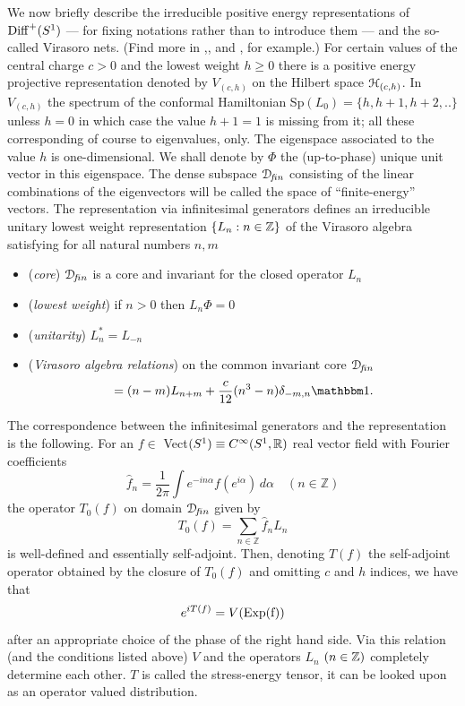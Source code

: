 \documentclass[12pt]{article}
\begin{document}
We now briefly describe the irreducible positive energy representations of
${{\rm Diff}^+(S^1)}$ --- for fixing notations rather than to introduce them ---
and the so-called Virasoro nets. (Find more in \cite{KaRa},\cite{GoWa},
\cite{Tol99} and
\cite{DMS}, for example.) For certain values of the central charge $c>0$
and the lowest weight $h \geq 0$ there is a positive energy
projective representation denoted by $V_{(c,h)}$ on the
Hilbert space ${\mathcal H}_{(c,h)}$.
In $V_{(c,h)}$ the spectrum of the conformal Hamiltonian
Sp$(L_0)=\{h,h+1,h+2,..\}$ unless $h=0$ in which case  
the value $h+1=1$ is missing from it; all these corresponding
of course to eigenvalues, only. The eigenspace associated to
the value $h$ is one-dimensional. We shall denote by $\Phi$
the (up-to-phase) unique unit vector in this eigenspace.
The dense subspace ${\mathcal D}\!_{f\!in}$ consisting of the linear combinations of the
eigenvectors will be called the space of ``finite-energy'' vectors.
The representation via infinitesimal generators defines an
irreducible unitary lowest weight representation 
$\{L_n : n \in {\mathbb Z} \}$ of the Virasoro algebra satisfying
for all natural numbers $n,m$
\begin{itemize}
\item[1.] \!({\it core})
${\mathcal D}\!_{f\!in}$ is a core and invariant for the closed operator $L_n$
\item[2.] \!({\it lowest weight})
if $n>0$ then $L_n \Phi = 0$
\item[3.] \!({\it unitarity})
$L_n^*=L_{-n}$
\item[4.] \!({\it Virasoro algebra relations})
on the common invariant core ${\mathcal D}\!_{f\!in}$
\begin{equation}
[L_n,L_m]=(n-m)L_{n+m}+\frac{c}{12}(n^3-n)\delta_{-m,n} \mathbbm 1.
\end{equation}
\end{itemize}
The correspondence between the infinitesimal generators and the
representation is the following.
For an $f\in $ Vect$(S^1) \equiv C^\infty(S^1,{\mathbb R})$ 
real vector field with Fourier coefficients
\begin{equation}
\hat{f}_n=\frac{1}{2\pi}\int e^{-in\alpha}f(e^{i\alpha})\,d\alpha 
\quad (n \in {\mathbb Z})
\end{equation}
the operator $T_0(f)$ on domain ${\mathcal D}\!_{f\!in}$ given by
\begin{equation}
T_0(f)=\mathop{\sum}_{n \in \mathbb Z} \hat{f}_n L_n
\end{equation} 
is well-defined and essentially self-adjoint. 
Then, denoting $T(f)$ the self-adjoint operator
obtained by the closure of $T_0(f)$ and omitting $c$ 
and $h$ indices, we have that 
\begin{equation}
e^{iT(f)} = V(\rm{Exp}(f))
\end{equation}
after an appropriate choice of the phase of the right hand side. 
Via this relation (and the conditions listed above) 
$V$ and the operators $L_n$ $(n \in {\mathbb Z})$ completely
determine each other. $T$ is called the stress-energy tensor, it can be
looked upon as an operator valued distribution.
\end{document}
